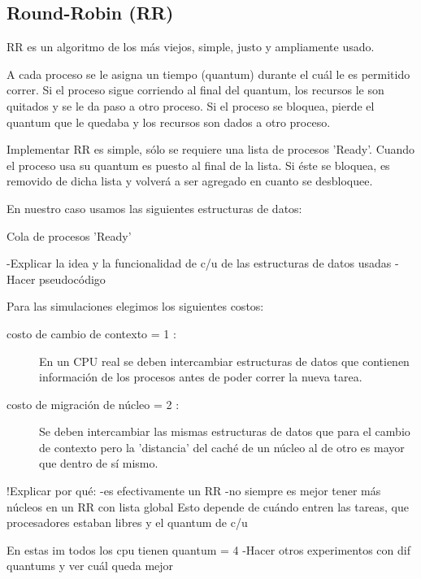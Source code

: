 \subsection{Round-Robin (RR)}
RR es un algoritmo de los más viejos, simple, justo y ampliamente usado.\newline

A cada proceso se le asigna un tiempo (quantum) durante el cuál le es permitido correr.
Si el proceso sigue corriendo al final del quantum, los recursos le son quitados y se le da paso a otro proceso.
Si el proceso se bloquea, pierde el quantum que le quedaba y los recursos son dados a otro proceso.\newline

Implementar RR es simple, sólo se requiere una lista de procesos 'Ready'.\newline
Cuando el proceso usa su quantum es puesto al final de la lista. \newline
Si éste se bloquea, es removido de dicha lista y volverá a ser agregado en cuanto se desbloquee.

En nuestro caso usamos las siguientes estructuras de datos:
 \begin{description}
  \item[Cola de procesos 'Ready']{}
 \end{description}
 
-Explicar la idea y la funcionalidad de c/u de las
estructuras de datos usadas
-Hacer pseudocódigo

Para las simulaciones elegimos los siguientes costos:
\begin{description}
 \item[costo de cambio de contexto = 1 :]{En un CPU real se deben intercambiar estructuras de datos que contienen información de los procesos antes de poder correr la nueva tarea.}
 \item[costo de migración de núcleo = 2 :]{Se deben intercambiar las mismas estructuras de datos que para el cambio de contexto pero la 'distancia' del caché de un núcleo al de otro es mayor que dentro de sí mismo.}
\end{description}

!Explicar por qué: 
-es efectivamente un RR
-no siempre es mejor tener más núcleos en un RR con lista global
Esto depende de cuándo entren las tareas, que procesadores
estaban libres y el quantum de c/u

En estas im todos los cpu tienen quantum = 4
-Hacer otros experimentos con dif quantums y ver cuál queda mejor

